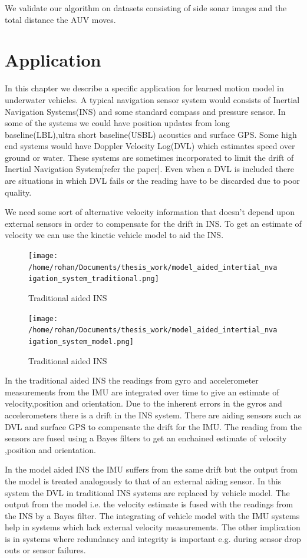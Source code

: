 \documentclass[12pt]{dalcsthesis}
\begin{document}
{We validate our algorithm on datasets consisting of side sonar images
and the total distance the AUV moves. 

\section{Application}
In this chapter we describe a specific application for learned motion model in underwater vehicles. A typical navigation sensor system would consists of Inertial Navigation Systems(INS) and some standard compass and pressure sensor. In some of the systems we could have position updates from long baseline(LBL),ultra short baseline(USBL) acoustics and surface GPS. Some high end systems would have Doppler Velocity Log(DVL) which estimates speed over ground or water. These systems are sometimes incorporated to limit the drift of Inertial Navigation System[refer the paper]. Even when a DVL is included there are situations in which DVL fails or the reading have to be discarded due to poor quality. 

We need some sort of alternative velocity information that doesn't depend upon external sensors in order to compensate for the drift in INS. To get an estimate of velocity we can use the kinetic vehicle model to aid the INS. 
\begin{figure}[hbtp]
\caption{Traditional aided INS}
\centering
\texttt{[image: /home/rohan/Documents/thesis\_work/model\_aided\_intertial\_nvaigation\_system\_traditional.png]}
\end{figure}

\begin{figure}[hbtp]
\caption{Traditional aided INS}
\centering
\texttt{[image: /home/rohan/Documents/thesis\_work/model\_aided\_intertial\_nvaigation\_system\_model.png]}
\end{figure}
In the traditional aided INS the readings from gyro and accelerometer measurements from the IMU are integrated over time to give an estimate of velocity,position and orientation. Due to the inherent errors in the gyros and accelerometers there is a drift in  the INS system. There are aiding sensors such as DVL and surface GPS to compensate the drift for the IMU. The reading from the sensors are fused using a Bayes filters to get an enchained estimate of velocity ,position and orientation. 

In the model aided INS the IMU suffers from the same drift but the output from the model is treated analogously to that of an external aiding sensor. In this system the DVL in traditional INS systems are replaced by vehicle model. The output from the model i.e. the velocity estimate is fused with the readings from the INS by a Bayes filter. The integrating of vehicle model with the IMU systems help in systems which lack external velocity measurements. The other implication is in systems where redundancy and integrity is important e.g. during sensor drop outs or sensor failures.

}
\end{document}
